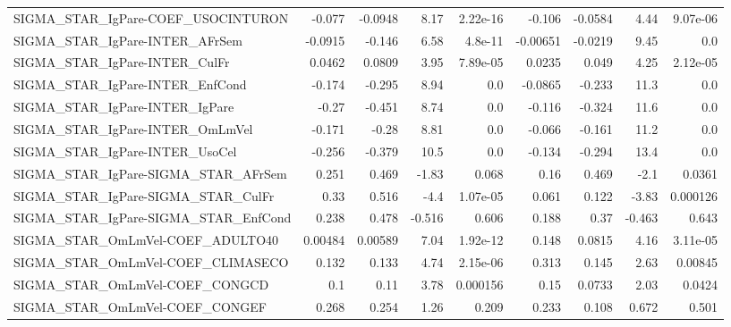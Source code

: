 \begin{tabular}{lrrrrrrrr}
SIGMA\_STAR\_IgPare-COEF\_USOCINTURON    &      -0.077 &      -0.0948 &    8.17 & 2.22e-16 &     -0.106 &     -0.0584 &         4.44 &      9.07e-06 \\
SIGMA\_STAR\_IgPare-INTER\_AFrSem        &     -0.0915 &       -0.146 &    6.58 &  4.8e-11 &   -0.00651 &     -0.0219 &         9.45 &           0.0 \\
SIGMA\_STAR\_IgPare-INTER\_CulFr         &      0.0462 &       0.0809 &    3.95 & 7.89e-05 &     0.0235 &       0.049 &         4.25 &      2.12e-05 \\
SIGMA\_STAR\_IgPare-INTER\_EnfCond       &      -0.174 &       -0.295 &    8.94 &      0.0 &    -0.0865 &      -0.233 &         11.3 &           0.0 \\
SIGMA\_STAR\_IgPare-INTER\_IgPare        &       -0.27 &       -0.451 &    8.74 &      0.0 &     -0.116 &      -0.324 &         11.6 &           0.0 \\
SIGMA\_STAR\_IgPare-INTER\_OmLmVel       &      -0.171 &        -0.28 &    8.81 &      0.0 &     -0.066 &      -0.161 &         11.2 &           0.0 \\
SIGMA\_STAR\_IgPare-INTER\_UsoCel        &      -0.256 &       -0.379 &    10.5 &      0.0 &     -0.134 &      -0.294 &         13.4 &           0.0 \\
SIGMA\_STAR\_IgPare-SIGMA\_STAR\_AFrSem   &       0.251 &        0.469 &   -1.83 &    0.068 &       0.16 &       0.469 &         -2.1 &        0.0361 \\
SIGMA\_STAR\_IgPare-SIGMA\_STAR\_CulFr    &        0.33 &        0.516 &    -4.4 & 1.07e-05 &      0.061 &       0.122 &        -3.83 &      0.000126 \\
SIGMA\_STAR\_IgPare-SIGMA\_STAR\_EnfCond  &       0.238 &        0.478 &  -0.516 &    0.606 &      0.188 &        0.37 &       -0.463 &         0.643 \\
SIGMA\_STAR\_OmLmVel-COEF\_ADULTO40      &     0.00484 &      0.00589 &    7.04 & 1.92e-12 &      0.148 &      0.0815 &         4.16 &      3.11e-05 \\
SIGMA\_STAR\_OmLmVel-COEF\_CLIMASECO     &       0.132 &        0.133 &    4.74 & 2.15e-06 &      0.313 &       0.145 &         2.63 &       0.00845 \\
SIGMA\_STAR\_OmLmVel-COEF\_CONGCD        &         0.1 &         0.11 &    3.78 & 0.000156 &       0.15 &      0.0733 &         2.03 &        0.0424 \\
SIGMA\_STAR\_OmLmVel-COEF\_CONGEF        &       0.268 &        0.254 &    1.26 &    0.209 &      0.233 &       0.108 &        0.672 &         0.501 \\

\end{tabular}
